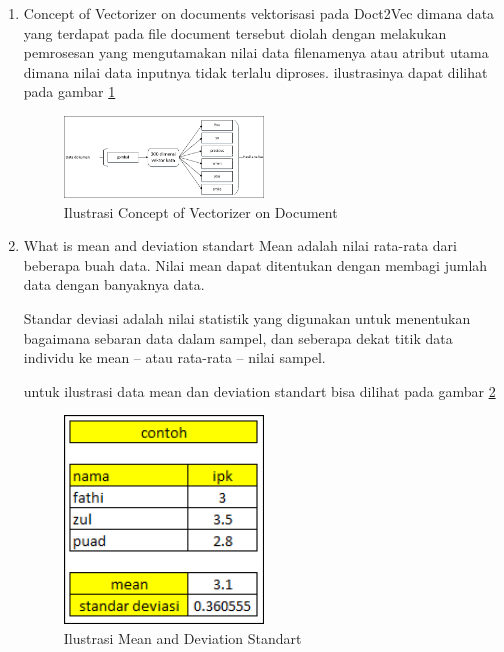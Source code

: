 \begin{enumerate}
\item Concept of Vectorizer on documents
\subitem vektorisasi pada Doct2Vec dimana data yang terdapat pada file document tersebut diolah dengan melakukan pemrosesan yang mengutamakan nilai data filenamenya atau atribut utama dimana nilai data inputnya tidak terlalu diproses. ilustrasinya dapat dilihat pada gambar \ref{fig4}
\begin{figure}[!htbp]
	\centering
	\includegraphics[width=0.5\textwidth]{figures/fathi/chapter5/hari1/4}
	\caption{Ilustrasi Concept of Vectorizer on Document}
	\label{fig4}
\end{figure}

\item What is mean and deviation standart
\subitem Mean adalah nilai rata-rata dari beberapa buah data. Nilai mean dapat ditentukan dengan membagi jumlah data dengan banyaknya data.

\subitem Standar deviasi adalah nilai statistik yang digunakan untuk menentukan bagaimana sebaran data dalam sampel, dan seberapa dekat titik data individu ke mean – atau rata-rata – nilai sampel.

untuk ilustrasi data mean dan deviation standart bisa dilihat pada gambar \ref{fig5}
\begin{figure}[!htbp]
	\centering
	\includegraphics[width=0.5\textwidth]{figures/fathi/chapter5/hari1/5}
	\caption{Ilustrasi Mean and Deviation Standart}
	\label{fig5}
\end{figure}


\end{enumerate}
